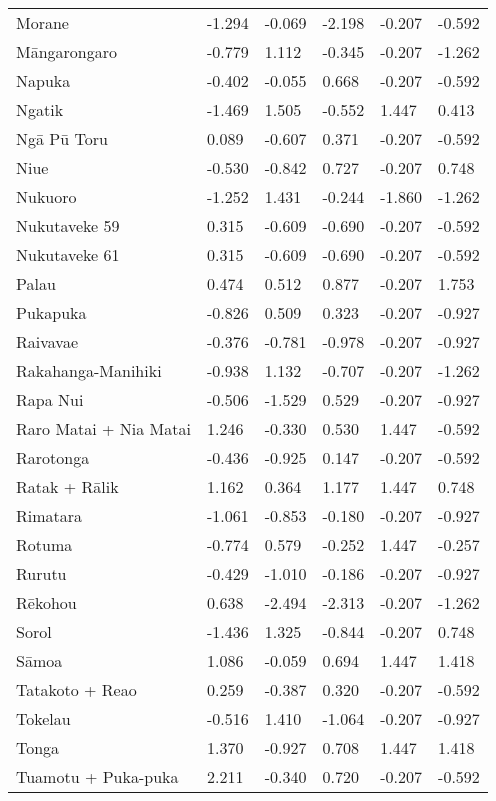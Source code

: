 \begin{longtable}{p{4.5cm}p{1.7cm}p{1.7cm}p{1.7cm}p{1.7cm}p{1.7cm}}
  Morane & -1.294 & -0.069 & -2.198 & -0.207 & -0.592 \\ 
  Māngarongaro & -0.779 & 1.112 & -0.345 & -0.207 & -1.262 \\ 
  Napuka & -0.402 & -0.055 & 0.668 & -0.207 & -0.592 \\ 
  Ngatik & -1.469 & 1.505 & -0.552 & 1.447 & 0.413 \\ 
  Ngā Pū Toru & 0.089 & -0.607 & 0.371 & -0.207 & -0.592 \\ 
  Niue & -0.530 & -0.842 & 0.727 & -0.207 & 0.748 \\ 
  Nukuoro & -1.252 & 1.431 & -0.244 & -1.860 & -1.262 \\ 
  Nukutaveke 59 & 0.315 & -0.609 & -0.690 & -0.207 & -0.592 \\ 
  Nukutaveke 61 & 0.315 & -0.609 & -0.690 & -0.207 & -0.592 \\ 
  Palau & 0.474 & 0.512 & 0.877 & -0.207 & 1.753 \\ 
  Pukapuka & -0.826 & 0.509 & 0.323 & -0.207 & -0.927 \\ 
  Raivavae & -0.376 & -0.781 & -0.978 & -0.207 & -0.927 \\ 
  Rakahanga-Manihiki & -0.938 & 1.132 & -0.707 & -0.207 & -1.262 \\ 
  Rapa Nui & -0.506 & -1.529 & 0.529 & -0.207 & -0.927 \\ 
  Raro Matai + Nia Matai & 1.246 & -0.330 & 0.530 & 1.447 & -0.592 \\ 
  Rarotonga & -0.436 & -0.925 & 0.147 & -0.207 & -0.592 \\ 
  Ratak + Rālik & 1.162 & 0.364 & 1.177 & 1.447 & 0.748 \\ 
  Rimatara & -1.061 & -0.853 & -0.180 & -0.207 & -0.927 \\ 
  Rotuma & -0.774 & 0.579 & -0.252 & 1.447 & -0.257 \\ 
  Rurutu & -0.429 & -1.010 & -0.186 & -0.207 & -0.927 \\ 
  Rēkohou & 0.638 & -2.494 & -2.313 & -0.207 & -1.262 \\ 
  Sorol & -1.436 & 1.325 & -0.844 & -0.207 & 0.748 \\ 
  Sāmoa & 1.086 & -0.059 & 0.694 & 1.447 & 1.418 \\ 
  Tatakoto + Reao & 0.259 & -0.387 & 0.320 & -0.207 & -0.592 \\ 
  Tokelau & -0.516 & 1.410 & -1.064 & -0.207 & -0.927 \\ 
  Tonga & 1.370 & -0.927 & 0.708 & 1.447 & 1.418 \\ 
  Tuamotu + Puka-puka & 2.211 & -0.340 & 0.720 & -0.207 & -0.592 \\ 

\end{longtable}
